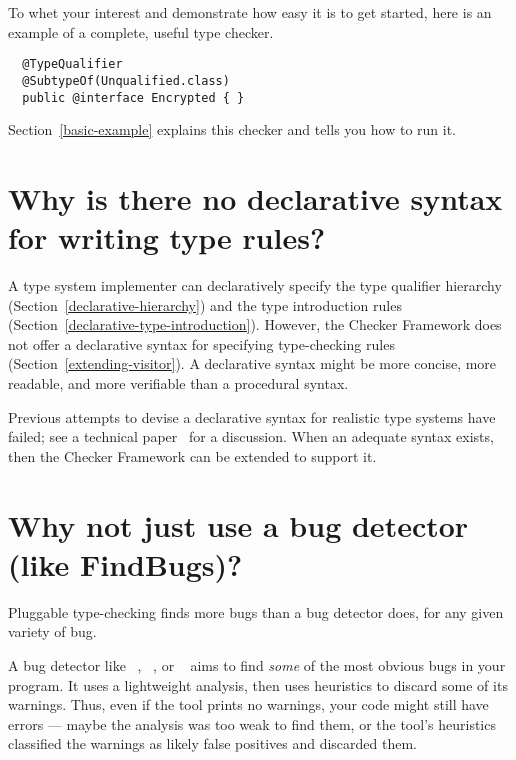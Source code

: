 To whet your interest and demonstrate how easy it is to get started, here
is an example of a complete, useful type checker.

\begin{Verbatim}
  @TypeQualifier
  @SubtypeOf(Unqualified.class)
  public @interface Encrypted { }
\end{Verbatim}

Section~\ref{basic-example} explains this checker and tells
you how to run it.


\section{Why is there no declarative syntax for writing type rules?\label{faq-declarative-syntax-for-type-rules}}

A type system implementer can declaratively specify the type qualifier
hierarchy (Section~\ref{declarative-hierarchy}) and the type introduction rules
(Section~\ref{declarative-type-introduction}).  However, the Checker
Framework does not offer a declarative syntax for specifying type-checking
rules (Section~\ref{extending-visitor}).
A declarative syntax might be more  concise, more readable, and more
verifiable than a procedural syntax.

Previous attempts to devise a declarative syntax 
for realistic type systems have failed; see a technical
paper~\cite{PapiACPE2008} for a discussion.  When an
adequate syntax exists, then the Checker Framework can be extended to
support it.


\section{Why not just use a bug detector (like FindBugs)?\label{faq-type-checking-vs-bug-detectors}}

Pluggable type-checking finds more bugs than a bug detector does, for any
given variety of bug.

A bug detector like ~\cite{HovemeyerP2004,HovemeyerSP2006},
~\cite{Artho2001}, or
~\cite{Copeland2005} aims to find \emph{some}
of the most obvious bugs in your program.  It uses a lightweight analysis,
then uses heuristics to discard some of its warnings.  Thus, even if the tool
prints no warnings, your code might still have errors --- maybe the
analysis was too weak to find them, or the tool's heuristics classified the
warnings as likely false positives and discarded them.

